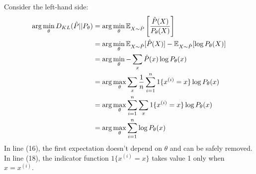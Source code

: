 \begin{answer}
Consider the left-hand side:
\begin{align}
	\arg\min_{\theta} D_{KL}(\hat{P}||P_{\theta}) 
	&= \arg\min_{\theta} \mathbb{E}_{X \sim \hat{P}} \left[\frac{\hat{P}(X)}{P_{\theta}(X)}\right] \\
	&= \arg\min_{\theta} \mathbb{E}_{X \sim \hat{P}}[\hat{P}(X)] - \mathbb{E}_{X \sim \hat{P}}[\log P_{\theta}(X)] \\
	&= \arg\min_{\theta} -\sum_x \hat{P}(x) \log P_{\theta}(x) \\
	&= \arg\max_{\theta} \sum_x \frac{1}{n} \sum_{i=1}^{n} 1\{x^{(i)} = x\} \log P_{\theta}(x) \\
	&= \arg\max_{\theta} \sum_{i=1}^{n} \sum_x 1\{x^{(i)} = x\} \log P_{\theta}(x) \\
	&= \arg\max_{\theta} \sum_{i=1}^{n} \log P_{\theta}(x)
\end{align}
In line (16), the first expectation doesn't depend on $\theta$ and can be safely removed. In line (18), the indicator function $1\{x^{(i)} = x\}$ takes value 1 only when $x = x^{(i)}$. \\
\end{answer}

